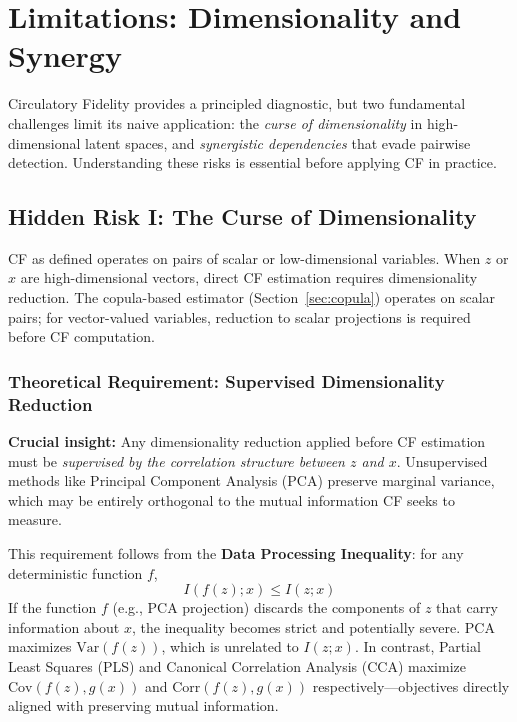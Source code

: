 \documentclass[10pt]{article} %
\theoremstyle{plain}
\theoremstyle{definition}
\newcommand{\Var}{\mathrm{Var}}
\newcommand{\Cov}{\mathrm{Cov}}
\begin{document}
\section{Limitations: Dimensionality and Synergy}
\label{sec:risks}

Circulatory Fidelity provides a principled diagnostic, but two fundamental challenges limit its naive application: the \emph{curse of dimensionality} in high-dimensional latent spaces, and \emph{synergistic dependencies} that evade pairwise detection. Understanding these risks is essential before applying CF in practice.

\subsection{Hidden Risk I: The Curse of Dimensionality}
\label{sec:dimensionality}

CF as defined operates on pairs of scalar or low-dimensional variables. When $z$ or $x$ are high-dimensional vectors, direct CF estimation requires dimensionality reduction. The copula-based estimator (Section~\ref{sec:copula}) operates on scalar pairs; for vector-valued variables, reduction to scalar projections is required before CF computation.

\subsubsection{Theoretical Requirement: Supervised Dimensionality Reduction}

\textbf{Crucial insight:} Any dimensionality reduction applied before CF estimation must be \emph{supervised by the correlation structure between $z$ and $x$}. Unsupervised methods like Principal Component Analysis (PCA) preserve marginal variance, which may be entirely orthogonal to the mutual information CF seeks to measure.

This requirement follows from the \textbf{Data Processing Inequality}: for any deterministic function $f$,
\begin{equation}
I(f(z); x) \leq I(z; x)
\end{equation}
If the function $f$ (e.g., PCA projection) discards the components of $z$ that carry information about $x$, the inequality becomes strict and potentially severe. PCA maximizes $\Var(f(z))$, which is unrelated to $I(z; x)$. In contrast, Partial Least Squares (PLS) and Canonical Correlation Analysis (CCA) maximize $\Cov(f(z), g(x))$ and $\text{Corr}(f(z), g(x))$ respectively---objectives directly aligned with preserving mutual information.
\end{document}
